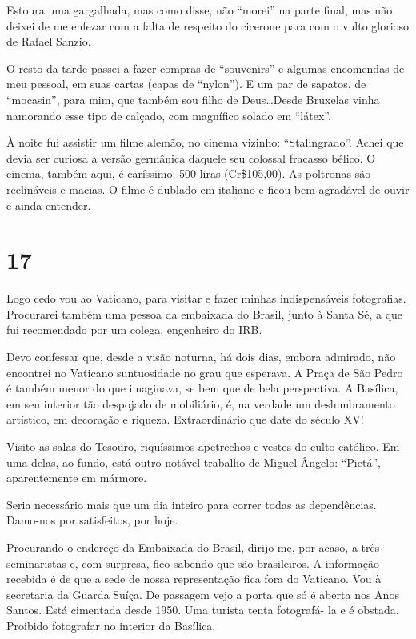 Estoura uma gargalhada, mas como disse, não ``morei'' na parte final, mas não deixei de me enfezar com a falta de respeito do cicerone para com o vulto glorioso de Rafael Sanzio.

O resto da tarde passei a fazer compras de ``souvenirs'' e algumas encomendas de meu pessoal, em suas cartas (capas de ``nylon''). E um par de sapatos, de ``mocasin'', para mim, que também sou filho de Deus\ldots Desde Bruxelas vinha namorando esse tipo de calçado, com magnífico solado em ``látex''.

À noite fui assistir um filme alemão, no cinema vizinho: ``Stalingrado''. Achei que devia ser curiosa a versão germânica daquele seu colossal fracasso bélico. O cinema, também aqui, é caríssimo: 500 liras (Cr\$105,00). As poltronas são reclináveis e macias. O filme é dublado em italiano e ficou bem agradável de ouvir e ainda entender.

\section*{17 \adfflatleafright {}}
Logo cedo vou ao Vaticano, para visitar e fazer minhas indispensáveis fotografias. Procurarei também uma pessoa da embaixada do Brasil, junto à Santa Sé, a que fui recomendado por um colega, engenheiro do IRB.

Devo confessar que, desde a visão noturna, há dois dias, embora admirado, não encontrei no Vaticano suntuosidade no grau que esperava. A Praça de São Pedro é também menor do que imaginava, se bem que de bela perspectiva. A Basílica, em seu interior tão despojado de mobiliário, é, na verdade um deslumbramento artístico, em decoração e riqueza. Extraordinário que date do século XV!

Visito as salas do Tesouro, riquíssimos apetrechos e vestes do culto católico. Em uma delas, ao fundo, está outro notável trabalho de Miguel Ângelo: ``Pietá'', aparentemente em mármore.

Seria necessário mais que um dia inteiro para correr todas as dependências. Damo-nos por satisfeitos, por hoje.

Procurando o endereço da Embaixada do Brasil, dirijo-me, por acaso, a três seminaristas e, com surpresa, fico sabendo que são brasileiros. A informação recebida é de que a sede de nossa representação fica fora do Vaticano. Vou à secretaria da Guarda Suíça. De passagem vejo a porta que só é aberta nos Anos Santos. Está cimentada desde 1950. Uma turista tenta fotografá- la e é obstada. Proibido fotografar no interior da Basílica.

